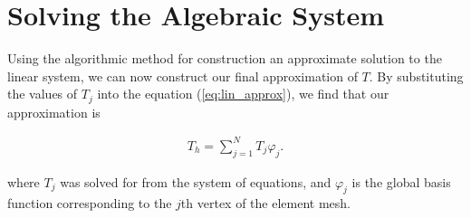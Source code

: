 \documentclass[../fem.tex]{subfiles}
\begin{document}
\section{Solving the Algebraic System}%
\label{sec:solving_the_algebraic_system}

Using the algorithmic method for construction an approximate solution to the
linear system, we can now construct our final approximation of $T$. By
substituting the values of $T_j$ into the equation (\ref{eq:lin_approx}), we
find that our approximation is

\begin{align}\label{eq:approx}
  T_h=\sum_{j=1}^NT_j\varphi_j.
\end{align}

where $T_j$ was solved for from the system of equations, and $\varphi_j$ is the
global basis function corresponding to the $j$th vertex of the element mesh.
\end{document}
